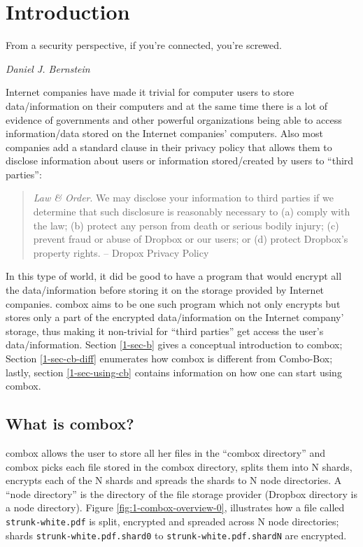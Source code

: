 \chapter{Introduction}

\epigraph{From a security perspective, if you're connected, you're
  screwed.}{\textit{Daniel J. Bernstein}}

Internet companies have made it trivial for computer users to store
data/information on their computers and at the same time there is a
lot of evidence of governments and other powerful organizations being
able to access information/data stored on the Internet companies'
computers\cite{website:wikileaks-spyfiles}. Also most companies add a
standard clause in their privacy policy that allows them to disclose
information about users or information stored/created by users to
``third parties'':

\begin{quote}
  \emph{Law \& Order}. We may disclose your information to third
  parties if we determine that such disclosure is reasonably necessary
  to (a) comply with the law; (b) protect any person from death or
  serious bodily injury; (c) prevent fraud or abuse of Dropbox or our
  users; or (d) protect Dropbox's property rights. -- Dropox Privacy
  Policy\cite{website:dropbox-privacy}
\end{quote}

In this type of world, it did be good to have a program that would
encrypt all the data/information before storing it on the storage
provided by Internet companies. combox aims to be one such program
which not only encrypts but stores only a part of the encrypted
data/information on the Internet company' storage, thus making it
non-trivial for ``third parties'' get access the user's
data/information. Section \ref{1-sec-b} gives a conceptual
introduction to combox; Section \ref{1-sec-cb-diff} enumerates how combox
is different from Combo-Box; lastly, section \ref{1-sec-using-cb}
contains information on how one can start using combox.

\section{What is combox?}\label{1-sec-cb}

combox allows the user to store all her files in the ``combox
directory'' and combox picks each file stored in the combox directory,
splits them into N shards, encrypts each of the N shards and spreads
the shards to N node directories. A ``node directory'' is the
directory of the file storage provider (Dropbox directory is a node
directory). Figure \ref{fig:1-combox-overview-0}, illustrates how a file
called \verb+strunk-white.pdf+ is split, encrypted and spreaded across
N node directories; shards \verb+strunk-white.pdf.shard0+ to
\verb+strunk-white.pdf.shardN+ are encrypted.


